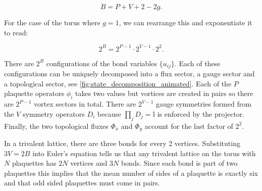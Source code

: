 \[B = P + V + 2 - 2g.\]

For the case of the torus where \(g = 1\), we can rearrange this and exponentiate it to read:

\[2^B = 2^{P-1}\cdot 2^{V-1} \cdot 2^2.\]

There are \(2^B\) configurations of the bond variables \(\{u_{ij}\}\). Each of these configurations can be uniquely decomposed into a flux sector, a gauge sector and a topological sector, see \cref{fig:state_decomposition_animated}. Each of the \(P\) plaquette operators \(\phi_i\) takes two values but vortices are created in pairs so there are \(2^{P-1}\) vortex sectors in total. There are \(2^{V-1}\) gauge symmetries formed from the \(V\) symmetry operators \(D_i\) because \(\prod_{j} D_j = \mathbb{I}\) is enforced by the projector. Finally, the two topological fluxes \(\Phi_x\) and \(\Phi_y\) account for the last factor of \(2^2\).

In a trivalent lattice, there are three bonds for every 2 vertices. Substituting \(3V = 2B\) into Euler's equation tells us that any trivalent lattice on the torus with \(N\) plaquettes has \(2N\) vertices and \(3N\) bonds. Since each bond is part of two plaquettes this implies that the mean number of sides of a plaquette is exactly six and that odd sided plaquettes must come in pairs.
